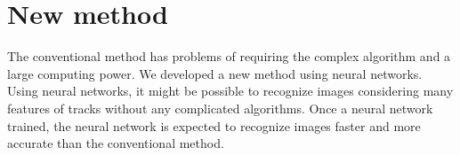 \documentclass{jps-cp}
\begin{document}
\section{New method}
The conventional method has problems of requiring the complex algorithm and a large computing power.
We developed a new method using neural networks.
Using neural networks, it might be possible to recognize images
considering many features of tracks without any complicated algorithms.
Once a neural network trained, the neural network is expected to recognize images faster and more accurate than the conventional method.

\end{document}
